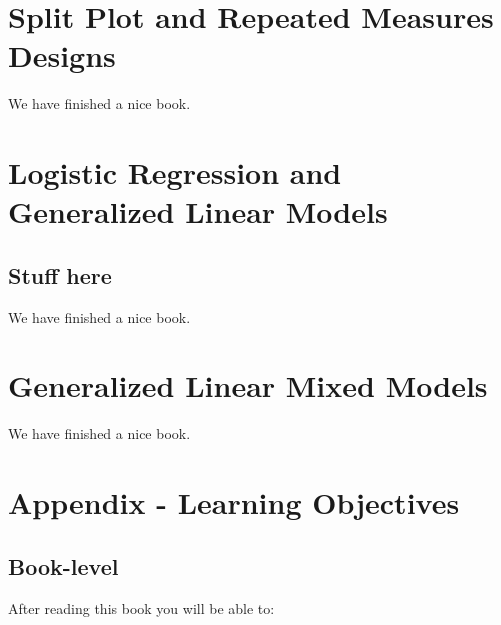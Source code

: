 \documentclass[]{book}
\begin{document}
\chapter{Split Plot and Repeated Measures
Designs}\label{repeatedmeasures}

We have finished a nice book.

\chapter{Logistic Regression and Generalized Linear
Models}\label{logistic}

\section{Stuff here}\label{stuff-here}

We have finished a nice book.

\chapter{Generalized Linear Mixed Models}\label{glmm}

We have finished a nice book.

\chapter{Appendix - Learning Objectives}\label{learningobj}

\section{Book-level}\label{book-level}

After reading this book you will be able to:
\end{document}
